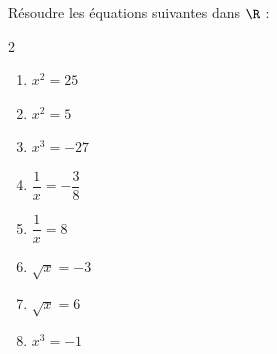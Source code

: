 \begin{exo}{}
	Résoudre les équations suivantes dans $\R$ :
	\vspace*{-2mm}
	\begin{multicols}{2}
	\begin{enumerate}[itemsep=2mm]
		\item $x^2 = 25$
		\item $x^2 = 5$
		\item $x^3 = -27$
		\item $\dfrac{1}{x} = -\dfrac{3}{8}$
		\item $\dfrac{1}{x} = 8$
		\item $\sqrt{x} = -3$
		\item $\sqrt{x} = 6$
		\item $x^3 = -1$
	\end{enumerate}
	\end{multicols}\vspace*{-2mm}
\end{exo}
